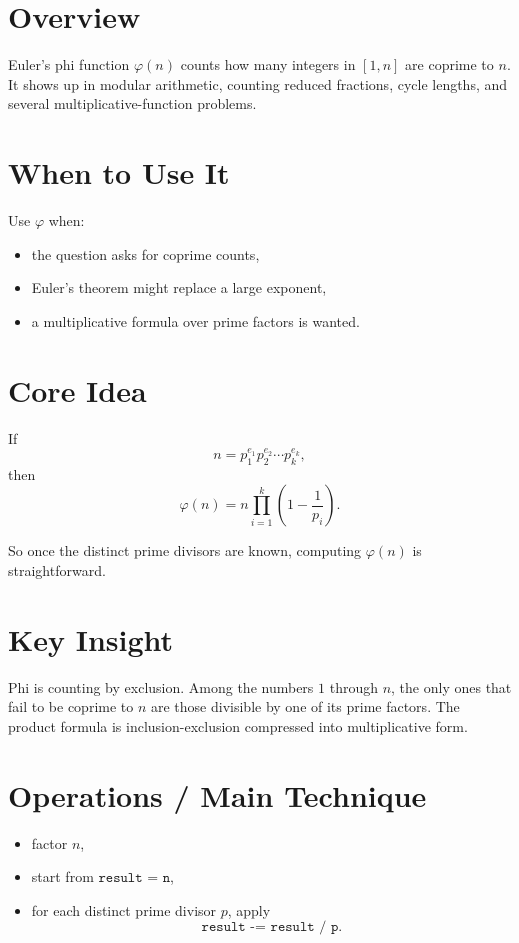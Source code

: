 \section*{Overview}

Euler's phi function \(\varphi(n)\) counts how many integers in \([1, n]\) are coprime to \(n\). It shows up in
modular arithmetic, counting reduced fractions, cycle lengths, and several multiplicative-function problems.

\section*{When to Use It}

Use \(\varphi\) when:

\begin{itemize}
  \item the question asks for coprime counts,
  \item Euler's theorem might replace a large exponent,
  \item a multiplicative formula over prime factors is wanted.
\end{itemize}

\section*{Core Idea}

If
\[
n = p_1^{e_1} p_2^{e_2} \cdots p_k^{e_k},
\]
then
\[
\varphi(n) = n \prod_{i=1}^{k}\left(1 - \frac{1}{p_i}\right).
\]

So once the distinct prime divisors are known, computing \(\varphi(n)\) is straightforward.

\section*{Key Insight}

Phi is counting by exclusion. Among the numbers \(1\) through \(n\), the only ones that fail to be coprime to \(n\) are
those divisible by one of its prime factors. The product formula is inclusion-exclusion compressed into multiplicative
form.

\section*{Operations / Main Technique}

\begin{itemize}
  \item factor \(n\),
  \item start from \(\texttt{result = n}\),
  \item for each distinct prime divisor \(p\), apply
  \[
  \texttt{result -= result / p}.
  \]
\end{itemize}

